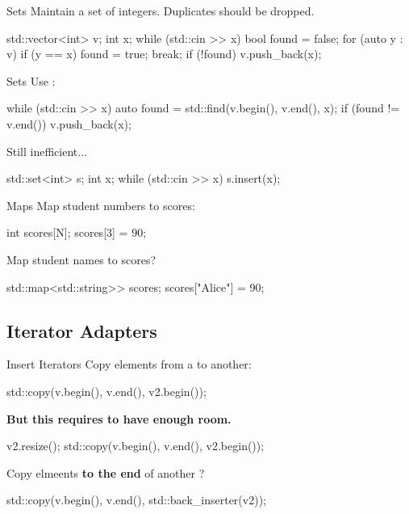 \begin{frame}[fragile]{Sets}
    Maintain a set of integers. Duplicates should be dropped.
    \begin{cpp}
std::vector<int> v;
int x;
while (std::cin >> x) {
  bool found = false;
  for (auto y : v)
    if (y == x) {
      found = true;
      break;
    }
  if (!found)
    v.push_back(x);
}
    \end{cpp}
\end{frame}

\begin{frame}[fragile]{Sets}
    Use :
    \begin{cpp}
while (std::cin >> x) {
  auto found = std::find(v.begin(), v.end(), x);
  if (found != v.end())
    v.push_back(x);
}
    \end{cpp}
    Still inefficient...
    \pause
    \begin{cpp}
std::set<int> s;
int x;
while (std::cin >> x)
  s.insert(x);
    \end{cpp}
\end{frame}

\begin{frame}[fragile]{Maps}
    Map student numbers to scores:
    \begin{cpp}
int scores[N];
scores[3] = 90;
    \end{cpp}
    Map student names to scores?
    \pause
    \begin{cpp}
std::map<std::string>> scores;
scores["Alice"] = 90;
    \end{cpp}
\end{frame}

\subsection{Iterator Adapters}

\begin{frame}[fragile]{Insert Iterators}
    Copy elements from a  to another:
    \begin{cpp}
std::copy(v.begin(), v.end(), v2.begin());
    \end{cpp}
    \textbf{But this requires  to have enough room.}
    \pause
    \begin{cpp}
v2.resize();
std::copy(v.begin(), v.end(), v2.begin());
    \end{cpp}
    \pause
    Copy elmeents \textbf{to the end} of another ?
    \pause
    \begin{cpp}
std::copy(v.begin(), v.end(), std::back_inserter(v2));
    \end{cpp}
\end{frame}


